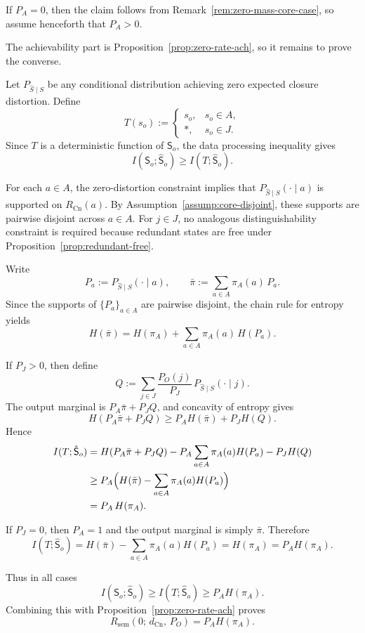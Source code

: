 \documentclass[journal,onecolumn]{IEEEtran}
\makeatletter
\newcommand{\Cn}{\text{Cn}}
\numberwithin{equation}{section}
\renewenvironment{proof}[1][\proofname]{\par
  \pushQED{\qed}%
  \normalfont \topsep6\p@\@plus6\p@\relax
  \trivlist
  \item[\hskip\labelsep
        \itshape
    #1\@addpunct{.}]\ignorespaces
}{%
  \popQED\endtrivlist\@endpefalse
}
\makeatother
\begin{document}
\begin{proof}
If \(P_A=0\), then the claim follows from
Remark~\ref{rem:zero-mass-core-case}, so assume henceforth that
\(P_A>0\).

The achievability part is Proposition~\ref{prop:zero-rate-ach}, so
it remains to prove the converse.

Let \(P_{\hat S\mid S}\) be any conditional distribution achieving
zero expected closure distortion. Define
\[
  T(s_o)
  :=
  \begin{cases}
    s_o, & s_o\in A,\\
    *,   & s_o\in J.
  \end{cases}
\]
Since \(T\) is a deterministic function of \({\mathsf{S}}_o\), the data
processing inequality \cite[Ch.~2]{cover2006elements} gives
\[
  I({\mathsf{S}}_o;\hat {\mathsf{S}}_o)\ge I(T;\hat {\mathsf{S}}_o).
\]

For each \(a\in A\), the zero-distortion constraint implies that
\(P_{\hat S\mid S}(\cdot\mid a)\) is supported on \(R_{\Cn}(a)\).
By Assumption~\ref{assump:core-disjoint}, these supports are
pairwise disjoint across \(a\in A\).
For \(j\in J\), no analogous distinguishability constraint is
required because redundant states are free under
Proposition~\ref{prop:redundant-free}.

Write
\[
  P_a:=P_{\hat S\mid S}(\cdot\mid a),
  \qquad
  \bar\pi:=\sum_{a\in A}\pi_A(a)\,P_a.
\]
Since the supports of \(\{P_a\}_{a\in A}\) are pairwise disjoint,
the chain rule for entropy \cite[Ch.~2]{cover2006elements}\cite[Ch.~3]{csiszar2011information} yields
\[
  H(\bar\pi)
  =
  H(\pi_A)+\sum_{a\in A}\pi_A(a)\,H(P_a).
\]

If \(P_J>0\), then define
\[
  Q:=\sum_{j\in J}\frac{P_O(j)}{P_J}\,
  P_{\hat S\mid S}(\cdot\mid j).
\]
The output marginal is \(P_A\bar\pi+P_JQ\), and concavity \cite[Ch.~2]{cover2006elements}\cite[Ch.~3]{csiszar2011information} of entropy
gives
\[
  H(P_A\bar\pi+P_JQ)
  \ge
  P_AH(\bar\pi)+P_JH(Q).
\]
Hence
\begin{align*}
  I(T;\hat {\mathsf{S}}_o)
  &= H(P_A\bar\pi+P_JQ)
     -P_A\sum_{a\in A}\pi_A(a)H(P_a)
     -P_JH(Q) \\
  &\ge
     P_A\Bigl(
       H(\bar\pi)-\sum_{a\in A}\pi_A(a)H(P_a)
     \Bigr) \\
  &= P_A\,H(\pi_A).
\end{align*}

If \(P_J=0\), then \(P_A=1\) and the output marginal is simply
\(\bar\pi\). Therefore
\[
  I(T;\hat {\mathsf{S}}_o)
  =
  H(\bar\pi)-\sum_{a\in A}\pi_A(a)H(P_a)
  =
  H(\pi_A)
  =
  P_AH(\pi_A).
\]

Thus in all cases
\[
  I({\mathsf{S}}_o;\hat {\mathsf{S}}_o)\ge I(T;\hat {\mathsf{S}}_o)\ge P_AH(\pi_A).
\]
Combining this with Proposition~\ref{prop:zero-rate-ach} proves
\[
  R_{\mathrm{sem}}(0;\,d_{\Cn},\,P_O)=P_AH(\pi_A).
\]
\end{proof}
\end{document}
